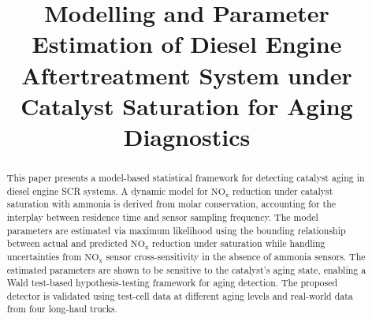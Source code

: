 \documentclass[subscriptcorrection,upint,varvw,barcolor=Goldenrod3,mathalfa=cal=euler,balance,hyphenate,french,pdf-a]{asmejour}
\newcommand{\nox}{\text{NO}_{\text{x}}}
\begin{document}


\title{Modelling and Parameter Estimation of Diesel Engine Aftertreatment System under Catalyst Saturation for Aging
   Diagnostics}


\begin{abstract}
This paper presents a model-based statistical framework for detecting catalyst aging
in diesel engine SCR systems. A dynamic model for $\nox$ reduction under catalyst
saturation with ammonia is derived from molar conservation, accounting for the
interplay between residence time and sensor sampling frequency. The model parameters
are estimated via maximum likelihood using the bounding relationship between actual
and predicted $\nox$ reduction under saturation while handling uncertainties from
$\nox$ sensor cross-sensitivity in the absence of ammonia sensors. The estimated
parameters are shown to be sensitive to the catalyst's aging state, enabling a Wald
test-based hypothesis-testing framework for aging detection. The proposed detector is
validated using test-cell data at different aging levels and real-world data from four
long-haul trucks.
\end{abstract}
\end{document}
